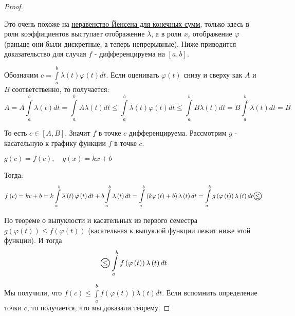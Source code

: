 \documentclass[../main.tex]{subfiles}
\begin{document}
\begin{proof}
    
    ~

    Это очень похоже на \hyperlink{thm:yensen}{неравенство Йенсена для конечных сумм}, только здесь в роли коэффициентов выступает отображение \( \lambda \), а в роли \( x_i\) отображение \( \varphi \) (раньше они были дискретные, а теперь непрерывные). Ниже приводится доказательство для случая \( f\) - дифференцируема на \( \left[ a,b\right]\). 

    Обозначим \( c = \displaystyle\int\limits_{ a}^{ b} \lambda \left( t\right) \varphi \left( t\right)dt\). Если оценивать \( \varphi \left( t\right)\) снизу и сверху как \( A\) и \( B\) соответственно, то получается:
    \[ A=A \displaystyle\int\limits_{ a}^{ b} \lambda \left( t\right)dt = \displaystyle\int\limits_{ a}^{ b} A \lambda \left( t\right)dt \leq \displaystyle\int\limits_{ a}^{ b} \lambda \left( t\right) \varphi \left( t\right)dt \leq \displaystyle\int\limits_{ a}^{ b} B \lambda \left( t\right)dt = B \displaystyle\int\limits_{ a}^{ b} \lambda \left( t\right)dt = B\]

    То есть \( c \in \left[ A,B\right]\). Значит \( f\) в точке \( c\) дифференцируема. Рассмотрим \( g\) - касательную к графику функции \( f\) в точке \( c\).

    \( g \left( c\right)= f\left( c\right),\quad g \left( x\right)=kx+b\)

    Тогда:
    \begin{equation*}
        \begin{aligned}
            f \left( c\right)=kc+b=k \displaystyle\int\limits_{ a}^{ b} \lambda \left( t\right) \varphi \left( t\right)dt + b \displaystyle\int\limits_{ a}^{ b} \lambda \left( t\right)dt= \displaystyle\int\limits_{ a}^{ b} \left( k \varphi \left( t\right)+b\right) \lambda \left( t\right)dt= \displaystyle\int\limits_{ a}^{ b} g \left( \varphi \left( t\right)\right) \lambda \left( t\right)dt \oleq
        \end{aligned}
    \end{equation*}

    По теореме о выпуклости и касательных из первого семестра \( g \left( \varphi \left( t\right)\right) \leq f \left( \varphi \left( t\right)\right)\) (касательная к выпуклой функции лежит ниже этой функции). И тогда
    \[ \oleq \displaystyle\int\limits_{ a}^{ b} f\left( \varphi \left( t\right)\right) \lambda \left( t\right)dt\]

    Мы получили, что \( f\left( c\right) \leq \displaystyle\int\limits_{ a}^{ b} f\left( \varphi \left( t\right)\right) \lambda \left( t\right)dt\). Если вспомнить определение точки \( c\), то получается, что мы доказали теорему. 
\end{proof}
\end{document}
